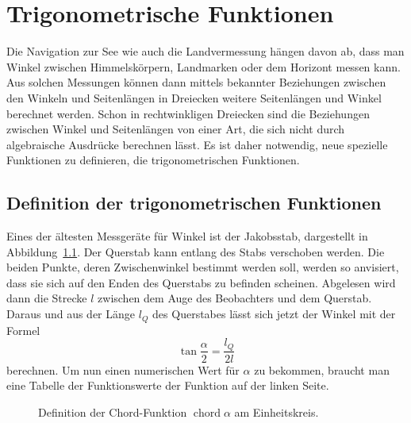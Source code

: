%
%
%
\section{Trigonometrische Funktionen
\label{buch:geometrie:section:trigonometrisch}}
Die Navigation zur See wie auch die Landvermessung hängen davon ab,
dass man Winkel zwischen Himmelskörpern, Landmarken oder dem Horizont
messen kann.
Aus solchen Messungen können dann mittels bekannter Beziehungen
zwischen den Winkeln und Seitenlängen in Dreiecken weitere Seitenlängen
und Winkel berechnet werden.
Schon in rechtwinkligen Dreiecken sind die Beziehungen zwischen Winkel
und Seitenlängen von einer Art, die sich nicht durch algebraische
Ausdrücke berechnen lässt.
Es ist daher notwendig, neue spezielle Funktionen zu definieren,
die trigonometrischen Funktionen.

\subsection{Definition der trigonometrischen Funktionen}
Eines der ältesten Messgeräte für Winkel ist der Jakobsstab,
dargestellt in Abbildung~\ref{}.
Der Querstab kann entlang des Stabs verschoben werden.
Die beiden Punkte, deren Zwischenwinkel bestimmt werden soll,
werden so anvisiert, dass sie sich auf den Enden des Querstabs 
zu befinden scheinen.
Abgelesen wird dann die Strecke $l$ zwischen dem Auge des Beobachters
und dem Querstab.
Daraus und aus der Länge $l_Q$ des Querstabes lässt sich jetzt der Winkel
mit der Formel
\[
\tan\frac{\alpha}2 = \frac{l_Q}{2l}
\]
berechnen.
Um nun einen numerischen Wert für $\alpha$ zu bekommen, braucht man
eine Tabelle der Funktionswerte der Funktion auf der linken Seite.

\begin{figure}
\centering
{}
\caption{Definition der Chord-Funktion $\operatorname{chord}\alpha$
am Einheitskreis.
\label{buch:geometrie:trigo:chorddef}}
\end{figure}

